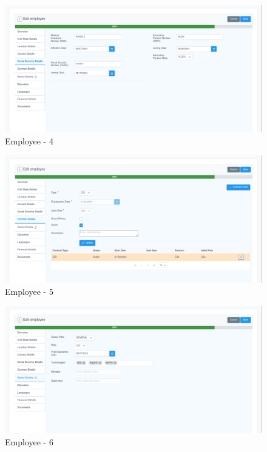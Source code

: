 \documentclass[12pt,a4paper,table,english]{article}
\begin{document}
		
	\begin{figure}[H]
		\centering
		\includegraphics[width=150mm]{Image/employee4}
		\caption{Employee - 4}
		\label{fig:Employee - 4}
	\end{figure}
	
		
	\begin{figure}[H]
		\centering
		\includegraphics[width=150mm]{Image/employee5}
		\caption{Employee - 5}
		\label{fig:Employee - 5}
	\end{figure}
	
		
	\begin{figure}[H]
		\centering
		\includegraphics[width=150mm]{Image/employee6}
		\caption{Employee - 6}
		\label{fig:Employee - 6}
	\end{figure}
	
\end{document}
